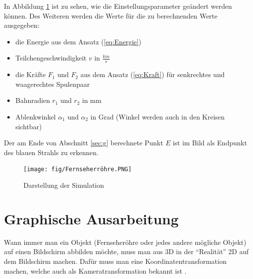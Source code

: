 In Abbildung \ref{fig:meineSimulation} ist zu sehen, wie die Einstellungsparameter geändert werden können. 
Des Weiteren werden die Werte für die zu berechnenden Werte ausgegeben:
\begin{itemize}
    \item die Energie aus dem Ansatz (\ref{eq:Energie})
    \item Teilchengeschwindigkeit $v$ in $\frac{km}{s}$
    \item die Kräfte $F_1$ und $F_2$ aus dem Ansatz (\ref{eq:Kraft}) für senkrechtes und waagerechtes Spulenpaar
    \item Bahnradien $r_1$ und $r_2$ in mm 
    \item Ablenkwinkel $\alpha_1$ und $\alpha_2$ in Grad (Winkel werden auch in den Kreisen sichtbar)
\end{itemize}
Der am Ende von Abschnitt \ref{sec:g} berechnete Punkt $E$ ist im Bild als Endpunkt des blauen Strahls zu erkennen.

\begin{figure}[h]
    \centering
    \texttt{[image: fig/Fernseherröhre.PNG]}
    \caption{Darstellung der Simulation}
    \label{fig:meineSimulation}
\end{figure}

\pagebreak
\section{\textbf{Graphische Ausarbeitung}}
Wann immer man ein Objekt (Fernseheröhre oder jedes andere mögliche Objekt) auf einen Bildschirm abbilden möchte, muss man aus 3D in der "`Realität"' 2D auf dem Bildschirm machen. Dafür muss man eine Koordinatentransformation machen, welche auch als Kameratransformation bekannt ist \cite{Kameratransformation}.

